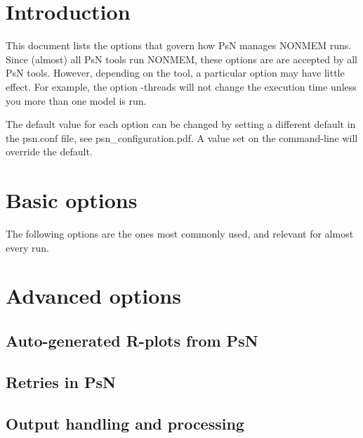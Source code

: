 



\maketitle
\newcommand{\guidetoolname}{<toolname>}

\section{Introduction}
This document lists the options that govern how PsN manages NONMEM runs.
Since (almost) all PsN tools run NONMEM, these options are 
are accepted by all PsN tools. 
However, depending on the tool, a particular option may have little effect. 
For example, the option -threads will not change the execution time unless 
you more than one model is run. 

The default value for each option can be changed by setting a different default in the psn.conf file, see 
psn\_configuration.pdf. A value set on the command-line will override the default.

\section{Basic options}
The following options are the ones most commonly used, and relevant for almost every run.


\section{Advanced options}
\subsection{Auto-generated R-plots from PsN}
\newcommand{\rplotsconditions}{
Most default templates depend on a couple of R libraries. If required R libraries are not installed then
no pdf will be generated. 
Check the .Rout file in the main run directory for error messages.
}


\subsection{Retries in PsN}


\subsection{Output handling and processing}


